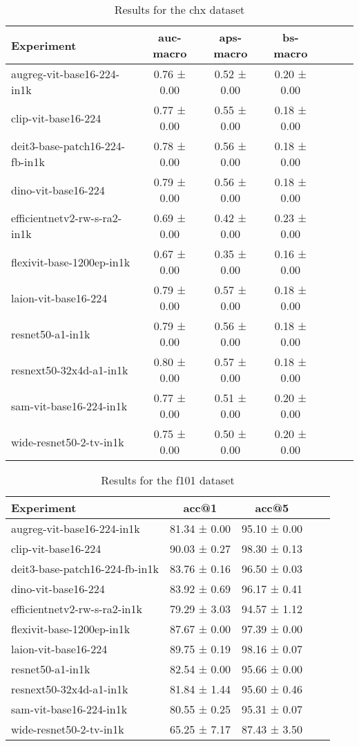 \begin{table}[htbp]
\caption{Results for the chx dataset}
\begin{tabular}{|l|c|c|c|c|c|c|}\hline
Experiment & auc-macro & aps-macro & bs-macro\\
\hline
augreg-vit-base16-224-in1k & 0.76 ± 0.00 & 0.52 ± 0.00 & 0.20 ± 0.00\\
\hline
clip-vit-base16-224 & 0.77 ± 0.00 & 0.55 ± 0.00 & 0.18 ± 0.00\\
\hline
deit3-base-patch16-224-fb-in1k & 0.78 ± 0.00 & 0.56 ± 0.00 & 0.18 ± 0.00\\
\hline
dino-vit-base16-224 & 0.79 ± 0.00 & 0.56 ± 0.00 & 0.18 ± 0.00\\
\hline
efficientnetv2-rw-s-ra2-in1k & 0.69 ± 0.00 & 0.42 ± 0.00 & 0.23 ± 0.00\\
\hline
flexivit-base-1200ep-in1k & 0.67 ± 0.00 & 0.35 ± 0.00 & 0.16 ± 0.00\\
\hline
laion-vit-base16-224 & 0.79 ± 0.00 & 0.57 ± 0.00 & 0.18 ± 0.00\\
\hline
resnet50-a1-in1k & 0.79 ± 0.00 & 0.56 ± 0.00 & 0.18 ± 0.00\\
\hline
resnext50-32x4d-a1-in1k & 0.80 ± 0.00 & 0.57 ± 0.00 & 0.18 ± 0.00\\
\hline
sam-vit-base16-224-in1k & 0.77 ± 0.00 & 0.51 ± 0.00 & 0.20 ± 0.00\\
\hline
wide-resnet50-2-tv-in1k & 0.75 ± 0.00 & 0.50 ± 0.00 & 0.20 ± 0.00\\
\hline
\end{tabular}
\end{table}

\begin{table}[htbp]
\caption{Results for the f101 dataset}
\begin{tabular}{|l|c|c|c|c|}\hline
Experiment & acc@1 & acc@5\\
\hline
augreg-vit-base16-224-in1k & 81.34 ± 0.00 & 95.10 ± 0.00\\
\hline
clip-vit-base16-224 & 90.03 ± 0.27 & 98.30 ± 0.13\\
\hline
deit3-base-patch16-224-fb-in1k & 83.76 ± 0.16 & 96.50 ± 0.03\\
\hline
dino-vit-base16-224 & 83.92 ± 0.69 & 96.17 ± 0.41\\
\hline
efficientnetv2-rw-s-ra2-in1k & 79.29 ± 3.03 & 94.57 ± 1.12\\
\hline
flexivit-base-1200ep-in1k & 87.67 ± 0.00 & 97.39 ± 0.00\\
\hline
laion-vit-base16-224 & 89.75 ± 0.19 & 98.16 ± 0.07\\
\hline
resnet50-a1-in1k & 82.54 ± 0.00 & 95.66 ± 0.00\\
\hline
resnext50-32x4d-a1-in1k & 81.84 ± 1.44 & 95.60 ± 0.46\\
\hline
sam-vit-base16-224-in1k & 80.55 ± 0.25 & 95.31 ± 0.07\\
\hline
wide-resnet50-2-tv-in1k & 65.25 ± 7.17 & 87.43 ± 3.50\\
\hline
\end{tabular}
\end{table}

